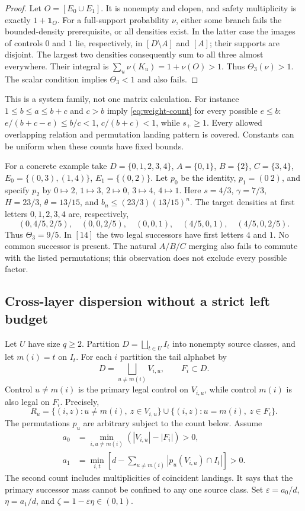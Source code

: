 \documentclass[11pt,reqno]{amsart}
\numberwithin{equation}{section}
\theoremstyle{definition}
\newcommand{\one}{\mathbf 1}
\newcommand{\eps}{\varepsilon}
\begin{document}
\begin{proof}
Let $O=[E_0\cup E_1]$. It is nonempty and clopen, and safety
multiplicity is exactly $1+\one_O$. For a full-support probability
$\nu$, either some branch fails the bounded-density prerequisite,
or all densities exist. In the latter case the images of controls
$0$ and $1$ lie, respectively, in $[D\setminus A]$ and $[A]$;
their supports are disjoint. The largest two densities consequently
sum to all three almost everywhere. Their integral is
$\sum_u\nu(K_u)=1+\nu(O)>1$. Thus $\Theta_3(\nu)>1$.
The scalar condition implies $\Theta_3<1$ and also fails.
\end{proof}

This is a system family, not one matrix calculation. For instance
$1\le b\le a\le b+c$ and $c>b$ imply
\eqref{eq:weight-count} for every possible $e\le b$:
$e/(b+c-e)\le b/c<1$, $c/(b+c)<1$, while $s_+\ge1$.
Every allowed overlapping relation and permutation landing pattern
is covered. Constants can be uniform when these counts have fixed
bounds.

For a concrete example take
$D=\{0,1,2,3,4\}$, $A=\{0,1\}$, $B=\{2\}$,
$C=\{3,4\}$, $E_0=\{(0,3),(1,4)\}$,
$E_1=\{(0,2)\}$. Let $p_0$ be the identity,
$p_1=(0\ 2)$, and specify $p_2$ by
$0\mapsto2$, $1\mapsto3$, $2\mapsto0$, $3\mapsto4$,
$4\mapsto1$. Here $s=4/3$, $\gamma=7/3$, $H=23/3$,
$\theta=13/15$, and
$b_n\le(23/3)(13/15)^n$. The target densities at first letters
$0,1,2,3,4$ are, respectively,
\[
 (0,4/5,2/5),\quad(0,0,2/5),\quad(0,0,1),\quad
 (4/5,0,1),\quad(4/5,0,2/5).
\]
Thus $\Theta_3=9/5$. In $[14]$ the two legal successors have
first letters $4$ and $1$. No common successor is present. The
natural $A/B/C$ merging also fails to commute with the listed
permutations; this observation does not exclude every possible factor.

\subsection{Cross-layer dispersion without a strict left budget}
Let $U$ have size $q\ge2$. Partition $D=\bigsqcup_{t\in U}I_t$
into nonempty source classes, and let $m(i)=t$ on $I_t$.
For each $i$ partition the tail alphabet by
\[
 D=\bigsqcup_{u\ne m(i)}V_{i,u},\qquad F_i\subset D.
\]
Control $u\ne m(i)$ is the primary legal control on $V_{i,u}$,
while control $m(i)$ is also legal on $F_i$. Precisely,
\begin{equation}\label{eq:spread-relation}
 R_u=\{(i,z):u\ne m(i),\ z\in V_{i,u}\}
 \cup\{(i,z):u=m(i),\ z\in F_i\}.
\end{equation}
The permutations $p_u$ are arbitrary subject to the count below.
Assume
\begin{align}
 a_0&=\min_{i,u\ne m(i)}(|V_{i,u}|-|F_i|)>0,
 \label{eq:spread-size}\\
 a_1&=\min_{i,t}\left[d-
       \sum_{u\ne m(i)}|p_u(V_{i,u})\cap I_t|\right]>0.
 \label{eq:spread-land}
\end{align}
The second count includes multiplicities of coincident landings.
It says that the primary successor mass cannot be confined to any
one source class. Set $\eps=a_0/d$, $\eta=a_1/d$, and
$\zeta=1-\eps\eta\in(0,1)$.
\end{document}
